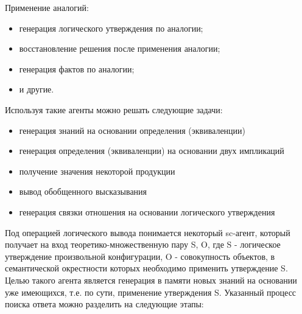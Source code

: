 Применение аналогий:
\begin{itemize}
	\item{генерация логического утверждения по аналогии;}
	\item{восстановление решения после применения аналогии;}
	\item{генерация фактов по аналогии;}
	\item{и другие.}
\end{itemize}

Используя такие агенты можно решать следующие задачи:
\begin{itemize}
	\item{генерация знаний на основании определения (эквиваленции)}
	\item{генерация определения (эквиваленции) на основании двух импликаций}
	\item{получение значения некоторой продукции}
	\item{вывод обобщенного высказывания}
	\item{генерация связки отношения на основании логического утверждения}
\end{itemize}

Под операцией логического вывода понимается некоторый sc-агент, который получает на вход теоретико-множественную пару {S, O}, где S - логическое утверждение произвольной конфигурации, O - совокупность объектов, в семантической окрестности которых необходимо применить утверждение S. Целью такого агента является генерация в памяти новых знаний на основании уже имеющихся, т.е. по сути, применение утверждения S. Указанный процесс поиска ответа можно разделить на следующие этапы:

